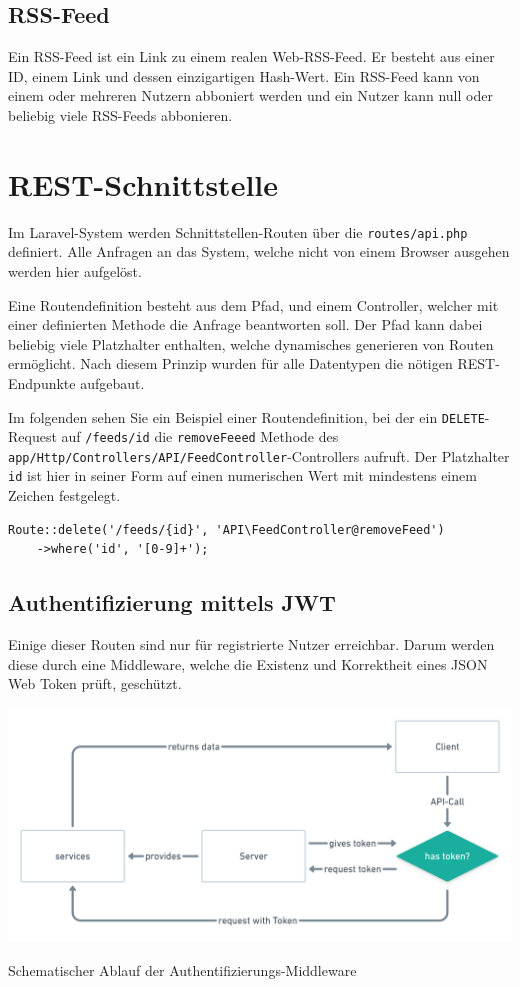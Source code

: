     \subsection{RSS-Feed}
        Ein RSS-Feed ist ein Link zu einem realen Web-RSS-Feed. Er besteht aus einer ID, einem Link und dessen einzigartigen Hash-Wert. Ein RSS-Feed kann von einem oder mehreren Nutzern abboniert werden und ein Nutzer kann null oder beliebig viele RSS-Feeds abbonieren.
    

\section{REST-Schnittstelle}

    Im Laravel-System werden Schnittstellen-Routen über die \texttt{routes/api.php} definiert. Alle Anfragen an das System, welche nicht von einem Browser ausgehen werden hier aufgelöst.
    
    Eine Routendefinition besteht aus dem Pfad, und einem Controller, welcher mit einer definierten Methode die Anfrage beantworten soll. Der Pfad kann dabei beliebig viele Platzhalter enthalten, welche dynamisches generieren von Routen ermöglicht. Nach diesem Prinzip wurden für alle Datentypen die nötigen REST-Endpunkte aufgebaut.
    
    Im folgenden sehen Sie ein Beispiel einer Routendefinition, bei der ein \texttt{DELETE}-Request auf \texttt{/feeds/{id}} die \texttt{removeFeeed} Methode des \texttt{app/Http/Controllers/API/FeedController}-Controllers aufruft. Der Platzhalter \texttt{{id}} ist hier in seiner Form auf einen numerischen Wert mit mindestens einem Zeichen festgelegt.

    \begin{lstlisting}
Route::delete('/feeds/{id}', 'API\FeedController@removeFeed')
    ->where('id', '[0-9]+');
    \end{lstlisting}
    
    \subsection{Authentifizierung mittels JWT}
        Einige dieser Routen sind nur für registrierte Nutzer erreichbar. Darum werden diese durch eine Middleware, welche die Existenz und Korrektheit eines JSON Web Token prüft, geschützt. 
        
        \begin{center}
            \includegraphics[width=\textwidth]{images/collector-jwt-auth-process.png}
            \caption{Schematischer Ablauf der Authentifizierungs-Middleware}
        \end{center}
        
